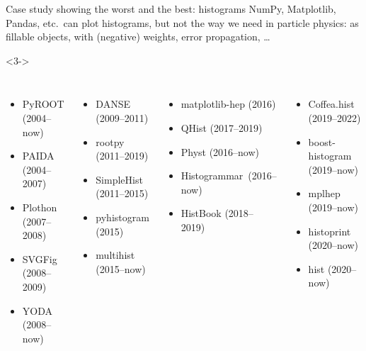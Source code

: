 \documentclass[aspectratio=169]{beamer}
\begin{document}
\begin{frame}{Case study showing the worst and the best: histograms}
\vspace{0.25 cm}
NumPy, Matplotlib, Pandas, etc.\ can plot histograms, but not the way we need in particle physics: as fillable objects, with (negative) weights, error propagation, \ldots

\vspace{0.5 cm}

\vspace{0.5 cm}

\vspace{0.5 cm}
\begin{uncoverenv}<3->
\begin{columns}
\scriptsize
{}
\begin{itemize}
\item PyROOT (2004--now)
\item PAIDA (2004--2007)
\item Plothon (2007--2008)
\item SVGFig (2008--2009)
\item YODA (2008--now)
\end{itemize}

\begin{itemize}
\item DANSE (2009--2011)
\item rootpy (2011--2019)
\item SimpleHist (2011--2015)
\item pyhistogram (2015)
\item multihist (2015--now)
\end{itemize}

\begin{itemize}
\item matplotlib-hep (2016)
\item QHist (2017--2019)
\item Physt (2016--now)
\item \mbox{Histogrammar (2016--now)\hspace{-0.2 cm}}
\item HistBook (2018--2019)
\end{itemize}

\begin{itemize}
\item Coffea.hist (2019--2022)
\item boost-histogram (2019--now)
\item mplhep (2019--now)
\item histoprint (2020--now)
\item hist (2020--now)
\end{itemize}

\end{columns}
\end{uncoverenv}
\end{frame}
\end{document}
